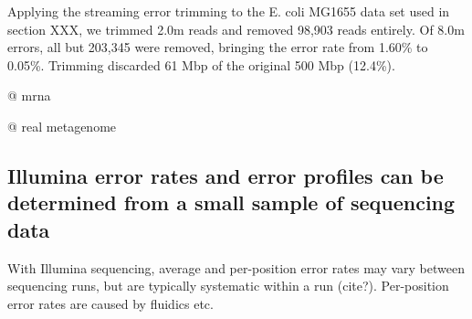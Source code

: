 \documentclass{article}
\begin{document}


%

Applying the streaming error trimming to the E. coli MG1655 data set
used in section XXX, we trimmed 2.0m reads and removed 98,903
reads entirely.  Of 8.0m errors, all but 203,345 were removed,
bringing the error rate from 1.60\% to 0.05\%.  Trimming discarded 61
Mbp of the original 500 Mbp (12.4\%).

%


@ mrna

% 


@ real metagenome

\subsection{Illumina error rates and error profiles can be determined from a
small sample of sequencing data}

With Illumina sequencing, average and per-position error rates may
vary between sequencing runs, but are typically systematic within a
run (cite?).  Per-position error rates are caused by fluidics etc.
\end{document}
